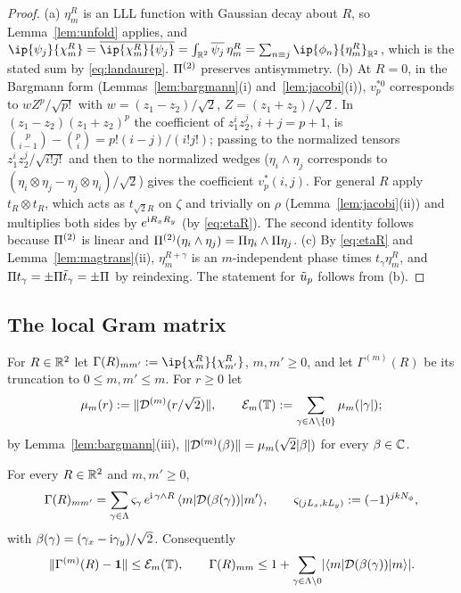 \begin{proof}
(a) $\eta_m^R$ is an LLL function with Gaussian decay about $R$, so Lemma~\ref{lem:unfold} applies, and
$\ip{\psi_j}{\chi_m^R}=\overline{\ip{\chi_m^R}{\psi_j}}=\int_{\R^2}\overline{\psi_j}\,\eta_m^R=\sum_{n\equiv j}\ip{\phi_n}{\eta_m^R}_{\R^2}$, which
is the stated sum by \eqref{eq:landaurep}. $\Pi^{(2)}$ preserves antisymmetry. (b) At $R=0$, in the Bargmann form
(Lemmas~\ref{lem:bargmann}(i) and~\ref{lem:jacobi}(i)), $v_p^{*0}$ corresponds to $wZ^p/\sqrt{p!}$ with $w=(z_1-z_2)/\sqrt2$,
$Z=(z_1+z_2)/\sqrt2$. In $(z_1-z_2)(z_1+z_2)^p$ the coefficient of $z_1^iz_2^j$, $i+j=p+1$, is
$\binom p{i-1}-\binom pi=p!(i-j)/(i!j!)$; passing to the normalized tensors $z_1^iz_2^j/\sqrt{i!j!}$ and then to the normalized
wedges ($\eta_i\wedge\eta_j$ corresponds to $(\eta_i\otimes\eta_j-\eta_j\otimes\eta_i)/\sqrt2$) gives the coefficient $v_p^*(i,j)$. For
general $R$ apply $t_R\otimes t_R$, which acts as $t_{\sqrt2R}$ on $\zeta$ and trivially on $\rho$ (Lemma~\ref{lem:jacobi}(ii)) and
multiplies both sides by $e^{\mathrm{i} R_xR_y}$ (by \eqref{eq:etaR}). The second identity follows because $\Pi^{(2)}$ is linear and
$\Pi^{(2)}(\eta_i\wedge\eta_j)=\Pi\eta_i\wedge\Pi\eta_j$.
(c) By \eqref{eq:etaR} and Lemma~\ref{lem:magtrans}(ii), $\eta_m^{R+\gamma}$ is an $m$-independent phase times $t_\gamma\eta_m^R$,
and $\Pi t_\gamma=\pm\Pi\tilde t_\gamma=\pm\Pi$ by reindexing. The statement for $\tilde u_p$ follows from (b).
\end{proof}

\subsection{The local Gram matrix}

For $R\in\mathbb{R}^2$ let $\Gamma(R)_{mm'}:=\ip{\chi_m^R}{\chi_{m'}^R}$, $m,m'\ge0$, and let $\Gamma^{(m)}(R)$ be its truncation to
$0\le m,m'\le m$. For $r\ge0$ let
\[
\mu_m(r):=\lVert\mathcal{D}^{(m)}(r/\sqrt2)\rVert,\qquad \mathcal{E}_m(\mathbb{T}):=\sum_{\gamma\in\Lambda\setminus\{0\}}\mu_m(\lvert\gamma\rvert);
\]
by Lemma~\ref{lem:bargmann}(iii), $\lVert\mathcal{D}^{(m)}(\beta)\rVert=\mu_m(\sqrt2\lvert\beta\rvert)$ for every $\beta\in\mathbb{C}$.

\begin{lemma}\label{lem:localgram}
For every $R\in\mathbb{R}^2$ and $m,m'\ge0$,
\begin{equation}\label{eq:localgram}
\Gamma(R)_{mm'}=\sum_{\gamma\in\Lambda}\varsigma_\gamma\,e^{\mathrm{i}\,\gamma\wedge R}\,\langle m\rvert\mathcal{D}(\beta(\gamma))\lvert m'\rangle,\qquad
\varsigma_{(jL_x,kL_y)}:=(-1)^{jkN_{\phi}},
\end{equation}
with $\beta(\gamma)=(\gamma_x-\mathrm{i}\gamma_y)/\sqrt2$. Consequently
\[
\lVert\Gamma^{(m)}(R)-\mathbf{1}\rVert\le\mathcal{E}_m(\mathbb{T}),\qquad \Gamma(R)_{mm}\le1+\sum_{\gamma\in\Lambda\setminus0}\lvert\langle m\rvert\mathcal{D}(\beta(\gamma))\lvert m\rangle\rvert.
\]
\end{lemma}

